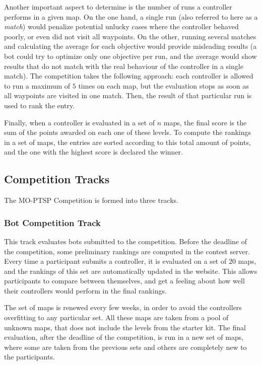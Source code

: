 \documentclass[conference]{IEEEtran}
\begin{document}
Another important aspect to determine is the number of runs a controller performs in a given map. On the one hand, a single run (also referred to here as a \textit{match}) would penalize potential unlucky cases where the controller behaved poorly, or even did not visit all waypoints. On the other, running several matches and calculating the average for each objective would provide misleading results (a bot could try to optimize only one objective per run, and the average would show results that do not match with the real behaviour of the controller in a single match). The competition takes the following approach: each controller is allowed to run a maximum of $5$ times on each map, but the evaluation stops as soon as all waypoints are visited in one match. Then, the result of that particular run is used to rank the entry.

Finally, when a controller is evaluated in a set of $n$ maps, the final score is the sum of the points awarded on each one of these levels. To compute the rankings in a set of maps, the entries are sorted according to this total amount of points, and the one with the highest score is declared the winner.
	
	
\subsection{Competition Tracks}

The MO-PTSP Competition is formed into three tracks.

\subsubsection{Bot Competition Track} This track evaluates bots submitted to the competition. Before the deadline of the competition, some preliminary rankings are computed in the contest server. Every time a participant submits a controller, it is evaluated on a set of $20$ maps, and the rankings of this set are automatically updated in the website. This allows participants to compare between themselves, and get a feeling about how well their controllers would perform in the final rankings.

The set of maps is renewed every few weeks, in order to avoid the controllers overfitting to any particular set. All these maps are taken from a pool of unknown maps, that does not include the levels from the starter kit. The final evaluation, after the deadline of the competition, is run in a new set of maps, where some are taken from the previous sets and others are completely new to the participants.
\end{document}
